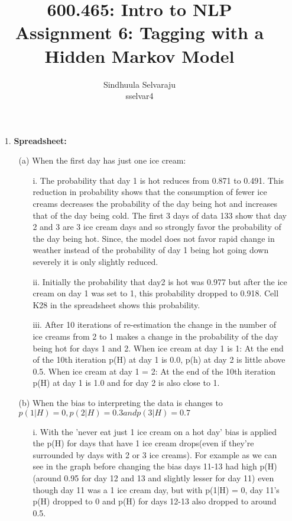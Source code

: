 \documentclass{article}
\title{600.465: Intro to NLP\\Assignment 6: Tagging with a Hidden Markov Model}
\author{Sindhuula Selvaraju\\sselvar4}
\begin{document}
\maketitle

\begin{enumerate}
    
\item[1.]
\textbf{Spreadsheet:}
\begin{enumerate}
    \item [(a)]When the first day has just one ice cream:
    \begin{enumerate}
        \item[i.]The probability that day 1 is hot reduces from 0.871 to 0.491. This reduction in probability shows that the consumption of fewer ice creams decreases the probability of the day being hot and increases that of the day being cold. The first 3 days of data 133 show that day 2 and 3 are 3 ice cream days and so strongly favor the probability of the day being hot. Since, the model does not favor rapid change in weather instead of the probability of day 1 being hot going down severely it is only slightly reduced.
        \\
        \item[ii.] Initially the probability that day2 is hot was 0.977 but after the ice cream on day 1 was set to 1, this probability dropped to 0.918. Cell K28 in the spreadsheet shows this probability.
        \\
        \item[iii.]After 10 iterations of re-estimation the change in the number of ice creams from 2 to 1 makes a change in the probability of the day being hot for days 1 and 2.
        When ice cream at day 1 is 1:
        At the end of the 10th iteration p(H) at day 1 is 0.0, p(h) at day 2 is little above 0.5.
        When ice cream at day 1 = 2:
        At the end of the 10th iteration p(H) at day 1 is 1.0 and for day 2 is also close to 1.
    \end{enumerate}
    \item[(b)]When the bias to interpreting the data is changes to $p(1|H)=0, p(2|H)=0.3 and p(3|H) = 0.7$
    \begin{enumerate}
        \item[i.] With the 'never eat just 1 ice cream on a hot day' bias is applied the p(H) for days that have 1 ice cream drops(even if they're surrounded by days with 2 or 3 ice creams). For example as we can see in the graph before changing the bias days 11-13 had high p(H)(around 0.95 for day 12 and 13 and slightly lesser for day 11) even though day 11 was a 1 ice cream day, but with p(1|H) = 0, day 11's p(H) dropped to 0 and p(H) for days 12-13 also dropped to around 0.5.

\end{enumerate}
\end{enumerate}
\end{enumerate}
\end{document}
